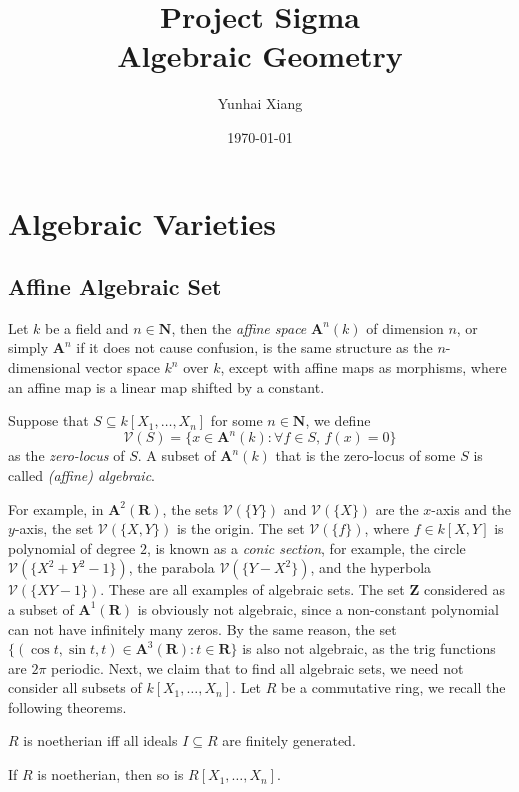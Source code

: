 \documentclass[11pt]{book}
\title{
\vspace{-2.0cm}
\Large{Project Sigma}\\
\vspace{1cm}
\huge{\bf{Algebraic Geometry}}
\vspace{3cm}}
\author{Yunhai Xiang}
\date{\today}
\begin{document}
\maketitle
\doublespacing
\tableofcontents
\singlespacing
\newpage
\chapter{Algebraic Varieties}
\section{Affine Algebraic Set}
Let $k$ be a field and $n\in\mathbf N$, then the \textit{affine space} $\mathbf A^n(k)$ of dimension $n$, or simply $\mathbf A^n$ if it does not cause confusion, is the same structure as the $n$-dimensional vector space $k^n$ over $k$, except with affine maps as morphisms, where an affine map is a linear map shifted by a constant. 

\begin{definition}
Suppose that $S\subseteq k[X_1,\dots,X_n]$ for some $n\in\mathbf N$, we define
\[\mathcal{V}(S)=\{x\in \mathbf A^n(k):\forall f\in S,\,f(x)=0\}\]
as the \textit{zero-locus} of $S$. A subset of $\mathbf A^n(k)$ that is the zero-locus of some $S$ is called \textit{(affine) algebraic}.
\end{definition}
For example, in $\mathbf{A}^2(\mathbf R)$, the sets $\mathcal{V}(\{Y\})$ and $\mathcal{V}(\{X\})$ are the $x$-axis and the $y$-axis, the set $\mathcal{V}(\{X,Y\})$ is the origin. The set $\mathcal{V}(\{f\})$, where $f\in k[X,Y]$ is polynomial of degree $2$, is known as a \textit{conic section}, for example, the circle $\mathcal{V}(\{X^2+Y^2-1\})$, the parabola $\mathcal{V}(\{Y-X^2\})$, and the hyperbola $\mathcal{V}(\{XY-1\})$. These are all examples of algebraic sets. The set $\mathbf Z$ considered as a subset of $\mathbf A^1(\mathbf R)$ is obviously not algebraic, since a non-constant polynomial can not have infinitely many zeros. By the same reason, the set $\{(\cos t,\sin t,t)\in\mathbf A^3(\mathbf R):t\in\mathbf R\}$ is also not algebraic, as the trig functions are $2\pi$ periodic. Next, we claim that to find all algebraic sets, we need not consider all subsets of $k[X_1,\dots,X_n]$. Let $R$ be a commutative ring, we recall the following theorems.
\begin{theorem}$R$ is noetherian iff all ideals $I\subseteq R$ are finitely generated.
\end{theorem}
\begin{theorem}If $R$ is noetherian, then so is $R[X_1,\dots,X_n]$.
\end{theorem}
\end{document}
